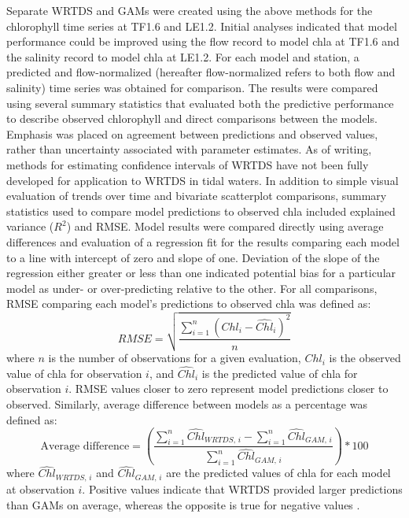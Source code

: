 \documentclass[letterpaper,12pt,oneside]{article}\usepackage[]{graphicx}\usepackage[]{color}
\begin{document}
Separate \ac{WRTDS} and \acp{GAM} were created using the above methods for the chlorophyll time series at TF1.6 and LE1.2.  Initial analyses indicated that model performance could be improved using the flow record to model \ac{chla} at TF1.6 and the salinity record to model \ac{chla} at LE1.2.  For each model and station, a predicted and flow-normalized (hereafter flow-normalized refers to both flow and salinity) time series was obtained for comparison.  The results were compared using several summary statistics that evaluated both the predictive performance to describe observed chlorophyll and direct comparisons between the models.  Emphasis was placed on agreement between predictions and observed values, rather than uncertainty associated with parameter estimates.  As of writing, methods for estimating confidence intervals of \ac{WRTDS} have not been fully developed for application to \ac{WRTDS} in tidal waters.  In addition to simple visual evaluation of trends over time and bivariate scatterplot comparisons, summary statistics used to compare model predictions to observed \ac{chla} included explained variance ($R^2$) and \ac{RMSE}.  Model results were compared directly using average differences and evaluation of a regression fit for the results comparing each model to a line with intercept of zero and slope of one.  Deviation of the slope of the regression either greater or less than one indicated potential bias for a particular model as under- or over-predicting relative to the other.  For all comparisons, \ac{RMSE} comparing each model's predictions to observed \ac{chla} was defined as:
\begin{equation}
RMSE = \sqrt {{\frac{{\sum\limits_{{i = 1}}^n {{{\left( {{Chl_i} - {{\hat{Chl}}_i}} \right)}^2}} }}{{n}}}}
\end{equation}
where $n$ is the number of observations for a given evaluation, $Chl_i$ is the observed value of \ac{chla} for observation $i$, and ${\hat{Chl}}_i$ is the predicted value of \ac{chla} for observation $i$.  \ac{RMSE} values closer to zero represent model predictions closer to observed.  Similarly, average difference between models as a percentage was defined as:
\begin{equation}
\textrm{Average difference} = \left(\frac{\sum\limits_{i = 1}^n \hat{Chl}_{WRTDS,\,i} - \sum\limits_{i = 1}^n \hat{Chl}_{GAM,\,i}}{\sum\limits_{i = 1}^n \hat{Chl}_{GAM,\,i}}\right) * 100
\end{equation}
where $\hat{Chl}_{WRTDS,\,i}$ and $\hat{Chl}_{GAM,\,i}$ are the predicted values of \ac{chla} for each model at observation $i$.  Positive values indicate that \ac{WRTDS} provided larger predictions than \acp{GAM} on average, whereas the opposite is true for negative values \citep{Moyer12}. 
\end{document}
